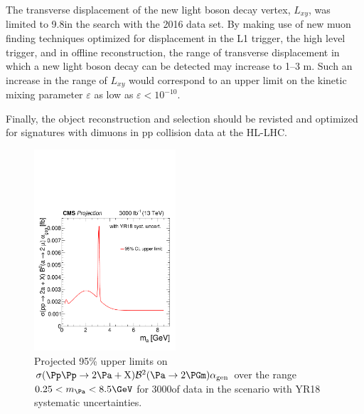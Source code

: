 The transverse displacement of the new light boson decay vertex, $L_{xy}$, was limited to 9.8\cm in the search with the 2016 data set. By making use of new muon finding techniques optimized for displacement in the L1 trigger, the high level trigger, and in offline reconstruction, the range of transverse displacement in which a new light boson decay can be detected may increase to {1--3 m}. %
Such an increase in the range of $L_{xy}$ would correspond to an upper limit on the kinetic mixing parameter $\varepsilon$ as low as $\varepsilon<10^{-10}$.

Finally, the object reconstruction and selection should be revisted and optimized for signatures with dimuons in pp collision data at the HL-LHC.

\begin{figure}
\centering
\includegraphics[width=0.47\textwidth]{plots/nmssm_plots_scenario_2/limit_CSxBR2xAlpha_fb_vs_mGammaD_3000.pdf}
\caption{Projected 95\% \CL upper limits on ${\sigma(\Pp\Pp \to 2 \Pa + \PX)  \mathcal{B}^2 (\Pa \to 2\PGm)  \alphaGen}$ over the range ${0.25 < \MPa < 8.5\GeV}$ for 3000\fbinv of data in the scenario with YR18 systematic uncertainties.}
\label{fig:my_label1}
\end{figure}


